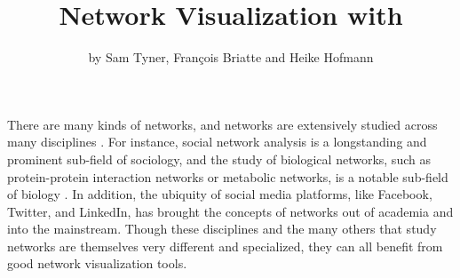\title{Network Visualization with }
\author{by Sam Tyner, Fran\c{c}ois Briatte and  Heike Hofmann}

\maketitle
{}






\par There are many kinds of networks, and networks are extensively studied across many disciplines \citep{watts2004ars}. For instance, social network analysis is a longstanding and prominent sub-field of sociology, and the study of biological networks, such as protein-protein interaction networks or metabolic networks, is a notable sub-field of biology \citep{prell2011social, junker2008analysis}. In addition, the ubiquity of social media platforms, like Facebook, Twitter, and LinkedIn, has brought the concepts of networks out of academia and into the mainstream. Though these disciplines and the many others that study networks are themselves very different and specialized, they can all benefit from good network visualization tools. 

